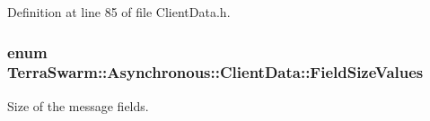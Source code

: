 Definition at line 85 of file Client\-Data.\-h.

\hypertarget{class_terra_swarm_1_1_asynchronous_1_1_client_data_ac66a46fcb609d1205cef15f85cd551b0}{
\subsubsection[{Field\-Size\-Values}]{\setlength{\rightskip}{0pt plus 5cm}enum {\bf Terra\-Swarm\-::\-Asynchronous\-::\-Client\-Data\-::\-Field\-Size\-Values}\hspace{0.3cm}{\ttfamily [private]}}}\label{class_terra_swarm_1_1_asynchronous_1_1_client_data_ac66a46fcb609d1205cef15f85cd551b0}


Size of the message fields. 

